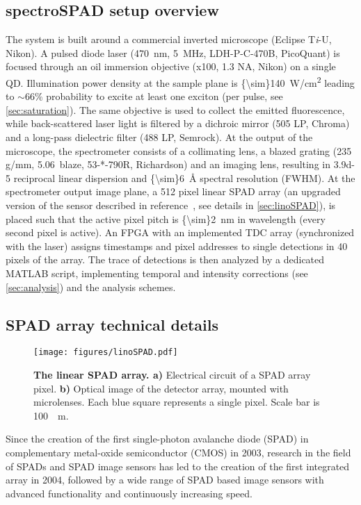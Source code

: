 \documentclass[journal=nalefd, manuscript=letter, layout=twocolumn]{achemso}
\begin{document}
\subsection{spectroSPAD setup overview}
The system is built around a commercial inverted microscope (Eclipse T\textit{i}-U, Nikon). A pulsed diode laser (\SI{470}{nm}, \SI{5}{MHz}, LDH-P-C-470B, PicoQuant) is focused through an oil immersion objective (x100, 1.3 NA, Nikon) on a single QD. Illumination power density at the sample plane is {\SI{{\sim}140}{W/cm^2}} leading to ${\sim}66\%$ probability to excite at least one exciton (per pulse, see \autoref{sec:saturation}). The same objective is used to collect the emitted fluorescence, while back-scattered laser light is filtered by a dichroic mirror (505 LP, Chroma) and a long-pass dielectric filter (488 LP, Semrock). At the output of the microscope, the spectrometer consists of a collimating lens, a blazed grating (235 g/mm, 5.06\textdegree\ blaze, 53-*-790R,  Richardson) and an imaging lens, resulting in \num{3.9d-5} reciprocal linear dispersion and \SI{{\sim}6}{\angstrom} spectral resolution (FWHM). At the spectrometer output image plane, a 512 pixel linear SPAD array (an upgraded version of the sensor described in reference\cite{Burri2017}~, see details in \autoref{sec:linoSPAD}), is placed such that the active pixel pitch is \SI{{\sim}2}{nm} in wavelength (every second pixel is active). An FPGA with an implemented TDC array (synchronized with the laser) assigns timestamps and pixel addresses to single detections in 40 pixels of the array. The trace of detections is then analyzed by a dedicated MATLAB script, implementing temporal and intensity corrections (see \autoref{sec:analysis}) and the analysis schemes.

\subsection{SPAD array technical details}
\label{sec:linoSPAD}

\begin{figure}[h]
    \centering
    \texttt{[image: figures/linoSPAD.pdf]}
    \caption{\textbf{The linear SPAD array. a)} Electrical circuit of a SPAD array pixel. \textbf{b)} Optical image of the detector array, mounted with microlenses. Each blue square represents a single pixel. Scale bar is \SI{100}{\mu m}.}
    \label{fig:linoSPAD}
\end{figure}

Since the creation of the first single-photon avalanche diode (SPAD) in complementary metal-oxide semiconductor (CMOS) in 2003, research in the field of SPADs and SPAD image sensors has led to the creation of the first integrated array in 2004, followed by a wide range of SPAD based image sensors with advanced functionality and continuously increasing speed.
\end{document}
